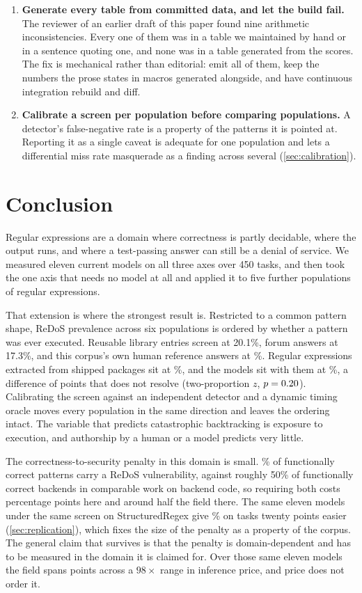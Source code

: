 \documentclass[11pt]{article}
\begin{document}
\begin{enumerate}
\item \textbf{Generate every table from committed data, and let the build
fail.} The reviewer of an earlier draft of this paper found nine arithmetic
inconsistencies. Every one of them was in a table we maintained by hand or in
a sentence quoting one, and none was in a table generated from the scores.
The fix is mechanical rather than editorial: emit all of them, keep the
numbers the prose states in macros generated alongside, and have continuous
integration rebuild and diff.

\item \textbf{Calibrate a screen per population before comparing
populations.} A detector's false-negative rate is a property of the patterns
it is pointed at. Reporting it as a single caveat is adequate for one
population and lets a differential miss rate masquerade as a finding across
several (\cref{sec:calibration}).
\end{enumerate}

\section{Conclusion}

Regular expressions are a domain where correctness is partly decidable, where
the output runs, and where a test-passing answer can still be a denial of
service. We measured eleven current models on all three axes over 450 tasks,
and then took the one axis that needs no model at all and applied it to five
further populations of regular expressions.

That extension is where the strongest result is. Restricted to a common
pattern shape, ReDoS prevalence across six populations is ordered by whether a
pattern was ever executed. Reusable library entries screen at 20.1\%, forum
answers at 17.3\%, and this corpus's own human reference answers at
\anchoredgold{}\%. Regular expressions extracted from shipped packages sit at
\anchoredprod{}\%, and the models sit with them at \anchoredmodels{}\%, a
difference of \modelprodraw{} points that does not resolve
(two-proportion $z$, $p = 0.20{}$). Calibrating the screen against an
independent detector
and a dynamic timing oracle moves every population in the same direction and
leaves the ordering intact. The variable that predicts catastrophic
backtracking is exposure to execution, and authorship by a human or a model
predicts very little.

The correctness-to-security penalty in this domain is small. \vulngivencorrect{}\%
of functionally correct patterns carry a ReDoS vulnerability, against roughly
50\% of functionally correct backends in comparable work on backend code, so
requiring both costs \safetyloss{} percentage points here and around half the
field there. The same eleven models under the same screen on
StructuredRegex give \srvulngivencorrect{}\% on tasks twenty points easier
(\cref{sec:replication}), which fixes the size of the penalty as a property of
the corpus. The general claim that survives is that the penalty is
domain-dependent and has to be measured in the domain it is claimed for. Over
those same eleven models the field spans \bandwidth{} points across a
$98\times$ range in inference price, and price does not order it.
\end{document}
